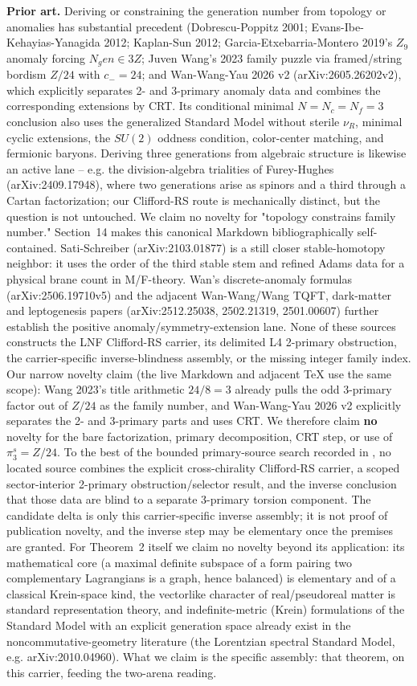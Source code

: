\documentclass[11pt]{article}
\theoremstyle{remark}
\begin{document}
\textbf{Prior art.} Deriving or constraining the generation number from topology or anomalies has substantial precedent (Dobrescu-Poppitz 2001; Evans-Ibe-Kehayias-Yanagida 2012; Kaplan-Sun 2012; Garcia-Etxebarria-Montero 2019's $Z_9$ anomaly forcing $N_gen \in 3Z$; Juven Wang's 2023 family puzzle via framed/string bordism $Z/24$ with $c_- = 24$; and Wan-Wang-Yau 2026 v2 (arXiv:2605.26202v2), which explicitly separates 2- and 3-primary anomaly data and combines the corresponding extensions by CRT. Its conditional minimal $N = N_c = N_f = 3$ conclusion also uses the generalized Standard Model without sterile $\nu_R$, minimal cyclic extensions, the $SU(2)$ oddness condition, color-center matching, and fermionic baryons. Deriving three generations from algebraic structure is likewise an active lane -- e.g. the division-algebra trialities of Furey-Hughes (arXiv:2409.17948), where two generations arise as spinors and a third through a Cartan factorization; our Clifford-RS route is mechanically distinct, but the question is not untouched. We claim no novelty for "topology constrains family number." Section~14 makes this canonical Markdown bibliographically self-contained. Sati-Schreiber (arXiv:2103.01877) is a still closer stable-homotopy neighbor: it uses the order of the third stable stem and refined Adams data for a physical brane count in M/F-theory. Wan's discrete-anomaly formulas (arXiv:2506.19710v5) and the adjacent Wan-Wang/Wang TQFT, dark-matter and leptogenesis papers (arXiv:2512.25038, 2502.21319, 2501.00607) further establish the positive anomaly/symmetry-extension lane. None of these sources constructs the LNF Clifford-RS carrier, its delimited L4 2-primary obstruction, the carrier-specific inverse-blindness assembly, or the missing integer family index. Our narrow novelty claim (the live Markdown and adjacent TeX use the same scope): Wang 2023's title arithmetic $24/8 = 3$ already pulls the odd 3-primary factor out of $Z/24$ as the family number, and Wan-Wang-Yau 2026 v2 explicitly separates the 2- and 3-primary parts and uses CRT. We therefore claim \textbf{no} novelty for the bare factorization, primary decomposition, CRT step, or use of $\pi_3^s = Z/24$. To the best of the bounded primary-source search recorded in , no located source combines the explicit cross-chirality Clifford-RS carrier, a scoped sector-interior 2-primary obstruction/selector result, and the inverse conclusion that those data are blind to a separate 3-primary torsion component. The candidate delta is only this carrier-specific inverse assembly; it is not proof of publication novelty, and the inverse step may be elementary once the premises are granted. For Theorem~2 itself we claim no novelty beyond its application: its mathematical core (a maximal definite subspace of a form pairing two complementary Lagrangians is a graph, hence balanced) is elementary and of a classical Krein-space kind, the vectorlike character of real/pseudoreal matter is standard representation theory, and indefinite-metric (Krein) formulations of the Standard Model with an explicit generation space already exist in the noncommutative-geometry literature (the Lorentzian spectral Standard Model, e.g. arXiv:2010.04960). What we claim is the specific assembly: that theorem, on this carrier, feeding the two-arena reading.
\end{document}
